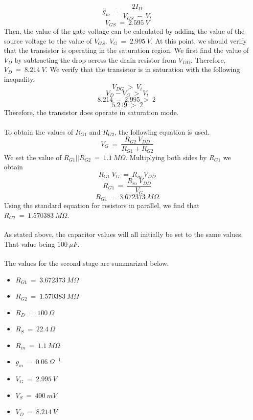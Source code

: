 \documentclass{article}
\begin{document}
    $$ g_m\ =\ \frac{2I_D}{V_{GS}\ -\ V_t} $$
    $$ V_{GS}\ =\ 2.595\ V $$
    Then, the value of the gate voltage can be calculated by adding the value of the source voltage to the value of $V_{GS}$. $V_{G}\ =\ 2.995\ V$. At this point, we should verify that the transistor is operating in the saturation region. We first find the value of $V_D$ by subtracting the drop across the drain resistor from $V_{DD}$. Therefore, $V_D\ =\ 8.214\ V$. We verify that the transistor is in saturation with the following inequality.
    $$ V_{DG}\ >\ V_t $$
    $$ V_{D} - V_G\ >\ V_t $$
    $$ 8.214\ -\ 2.995\ >\ 2\ $$
    $$ 5.219\ >\ 2 $$  
    Therefore, the transistor does operate in saturation mode. \\ \\
    To obtain the values of $R_{G1}$ and $R_{G2}$, the following equation is used.
    $$ V_G\ =\ \frac{R_{G2}\ V_{DD}}{R_{G1} + R_{G2}}$$
    We set the value of $R_{G1}||R_{G2}\ =\ 1.1\ M\Omega$. Multiplying both sides by $R_{G1}$ we obtain
    $$ R_{G1}\ V_G\ =\ R_{in}\ V_{DD}$$
    $$ R_{G1}\ =\ \frac{R_{in}\ V_{DD}}{V_G}$$
    $$ R_{G1}\ =\ 3.672373\ M\Omega$$
    Using the standard equation for resistors in parallel, we find that $R_{G2}\ =\ 1.570383\ M\Omega$. \\ \\
    As stated above, the capacitor values will all initially be set to the same values. That value being $100\ \mu F$. \\  \\
   \noindent The values for the second stage are summarized below.\\ 
    \begin{itemize}
    \item $R_{G1}\ =\ 3.672373\ M\Omega$ 
    \item $R_{G2}\ =\ 1.570383\ M\Omega$
    \item $R_D\ =\ 100\ \Omega$
    \item $R_S\ =\ 22.4\ \Omega$
    \item $R_{in}\ =\ 1.1\ M\Omega$
    \item $g_m\ =\ 0.06\ \Omega^{-1}$
    \item $V_G\ =\ 2.995\ V$
    \item $V_S\ =\ 400\ mV$
    \item $V_D\ =\ 8.214\ V$
    \end{itemize}
\end{document}
